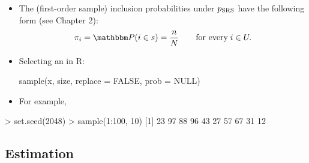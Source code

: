 \documentclass{my_eth_beamer}
\numberwithin{equation}{section}
\begin{document}
\begin{frame}[fragile]
    \begin{itemize}
    \setlength{\itemsep}{12pt}
        \item The (first-order sample) \alert{inclusion probabilities} under
            $p_{\mathrm{SRS}}$ have the following form (see Chapter 2):
            \begin{equation*}
                \pi_i = \PP(i \in s) = \frac{n}{N} \qquad \text{for every}
                    \; i \in U.
            \end{equation*}
        \item \alert{Selecting} an \SRS in \textsf{R}:

        \vspace{1em}

\begin{Rcode}
    sample(x, size, replace = FALSE, prob = NULL)
\end{Rcode}

        \item For example,
    \end{itemize}

\begin{Rcode}
    > set.seed(2048)
    > sample(1:100, 10)
    [1] 23 97 88 96 43 27 57 67 31 12
\end{Rcode}

\end{frame}

\subsection{Estimation}
\end{document}
